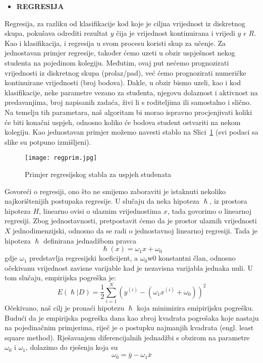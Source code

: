 \documentclass[times, utf8, zavrsni, numeric]{fer}
\begin{document}
\let\labelitemi\labelitemii
\begin{itemize}
  \item \textbf{REGRESIJA}
\end{itemize}

Regresija, za razliku od klasifikacije kod koje je ciljna vrijednost iz diskretnog skupa, pokušava odrediti rezultat $y$ čija je vrijednost kontinuirana i vrijedi $y$ $\epsilon$ $R$. Kao i klasifikacija, i regresija u svom procesu koristi skup za učenje. Za jednostavan primjer regresije, također ćemo uzeti u obzir uspješnost nekog studenta na pojedinom kolegiju. Međutim, ovaj put nećemo prognozirati vrijednosti iz diskretnog skupa (prolaz/pad), već ćemo prognozirati numeričke kontinuirane vrijednosti (broj bodova). Dakle, u obzir bismo uzeli, kao i kod klasifikacije, neke parametre vezano za studenta, njegovu dolaznost i aktivnost na predavanjima, broj napisanih zadaća, živi li s roditeljima ili samostalno i slično. Na temelju tih parametara, naš algoritam bi morao ispravno procjenjivati koliki će biti konačni uspjeh, odnosno koliko će bodova student ostvariti na nekom kolegiju. Kao jednostavan primjer možemo navesti stablo na Slici~\ref{fig:regprim} (svi podaci sa slike su potpuno izmišljeni).

\begin{figure}[H]
\centering
\texttt{[image: regprim.jpg]}
\caption{Primjer regresijskog stabla za uspjeh studenata}
\label{fig:regprim}
\end{figure}
Govoreći o regresiji, ono što ne smijemo zaboraviti je istaknuti nekoliko najkorištenijih postupaka regresije. U slučaju da neka hipoteza $\hslash$, iz prostora hipoteza $H$, linearno ovisi o ulaznim vrijednostima $x$, tada govorimo o linearnoj regresiji. Zbog jednostavnosti, pretpostavit ćemo da je prostor ulaznih vrijednosti $X$ jednodimenzijski, odnosno da se radi o jednostavnoj linearnoj regresiji. Tada je hipoteza $\hslash$ definirana jednadžbom pravca 
\begin{equation}
\hslash(x) = \omega_1 x + \omega_0
\end{equation}
gdje $\omega_1$ predstavlja regresijski koeficijent, a $\omega_0$w0 konstantni član, odnosno očekivanu vrijednost zavisne varijable kad je nezavisna varijabla jednaka nuli\cite{skrip}.
U tom slučaju, empirijska pogreška je:
\begin{equation}
E(\hslash|D)=\frac{1}{2}\sum_{i=1}^{N}(y^{(i)}-(\omega_1 x^{(i)} + \omega_0))^2
\end{equation}
Očekivano, naš cilj je pronaći hipotezu $\hslash$ koja minimizira emipirijsku pogrešku. Budući da je empirijska pogreška dana kao zbroj kvadrata pogrešaka koje nastaju na pojedinačnim primjerima, riječ je o postupku najmanjih kvadrata (engl. least square method). Rješavanjem diferencijalnih jednadžbi s obzirom na parametre $\omega_0$ i $\omega_1$, dolazimo do rješenja koja su
\begin{equation}
\omega_0=\bar{y}-\omega_1 \bar{x}
\end{equation}
\end{document}
